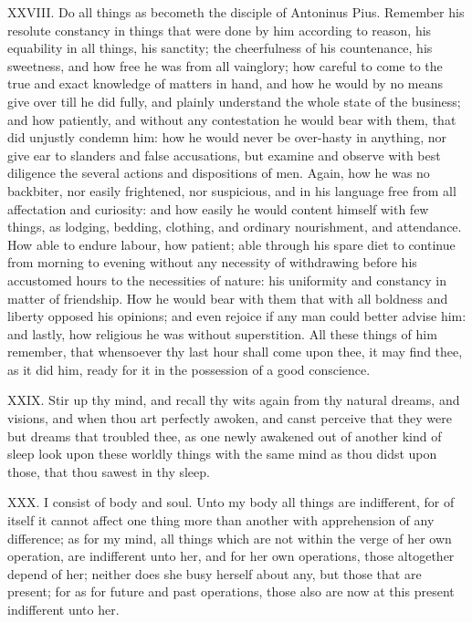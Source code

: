XXVIII. Do all things as becometh the disciple of Antoninus Pius.
Remember his resolute constancy in things that were done by him according
to reason, his equability in all things, his sanctity; the cheerfulness of
his countenance, his sweetness, and how free he was from all vainglory;
how careful to come to the true and exact knowledge of matters in hand,
and how he would by no means give over till he did fully, and plainly
understand the whole state of the business; and how patiently, and without
any contestation he would bear with them, that did unjustly condemn him:
how he would never be over-hasty in anything, nor give ear to slanders and
false accusations, but examine and observe with best diligence the several
actions and dispositions of men. Again, how he was no backbiter, nor
easily frightened, nor suspicious, and in his language free from all
affectation and curiosity: and how easily he would content himself with
few things, as lodging, bedding, clothing, and ordinary nourishment, and
attendance. How able to endure labour, how patient; able through his spare
diet to continue from morning to evening without any necessity of
withdrawing before his accustomed hours to the necessities of nature: his
uniformity and constancy in matter of friendship. How he would bear with
them that with all boldness and liberty opposed his opinions; and even
rejoice if any man could better advise him: and lastly, how religious he
was without superstition. All these things of him remember, that
whensoever thy last hour shall come upon thee, it may find thee, as it did
him, ready for it in the possession of a good conscience.

XXIX. Stir up thy mind, and recall thy wits again from thy natural
dreams, and visions, and when thou art perfectly awoken, and canst
perceive that they were but dreams that troubled thee, as one newly
awakened out of another kind of sleep look upon these worldly things with
the same mind as thou didst upon those, that thou sawest in thy sleep.

XXX. I consist of body and soul. Unto my body all things are
indifferent, for of itself it cannot affect one thing more than another
with apprehension of any difference; as for my mind, all things which are
not within the verge of her own operation, are indifferent unto her, and
for her own operations, those altogether depend of her; neither does she
busy herself about any, but those that are present; for as for future and
past operations, those also are now at this present indifferent unto her.

